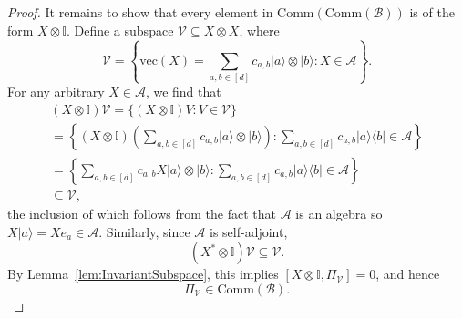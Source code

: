 \begin{proof}
It remains to show that every element in $\text{Comm}(\text{Comm}(\mathcal{B}))$ is of the form $X \otimes \mathbb{I}$.
Define a subspace $\mathcal{V} \subseteq X \otimes X$, where
\begin{equation}
    \mathcal{V} = \left\{\text{vec}(X) = \sum_{a, b \in [d]} c_{a, b} |a \rangle \otimes |b \rangle : X \in \mathcal{A} \right\}.
\end{equation}
For any arbitrary $X \in \mathcal{A}$, we find that
\begin{equation}
    \begin{split}
        (X \otimes \mathbb{I}) \mathcal{V}
        = \{(X \otimes \mathbb{I}) V : V \in \mathcal{V}\}\\
        = \left\{ (X \otimes \mathbb{I}) \left( \sum_{a, b \in [d]} c_{a, b} |a \rangle \otimes |b \rangle \right) : \sum_{a, b \in [d]} c_{a, b} |a \rangle \langle b | \in \mathcal{A} \right\}\\
        = \left\{ \sum_{a, b \in [d]} c_{a, b} X|a\rangle \otimes |b\rangle : \sum_{a, b \in [d]} c_{a, b} |a \rangle \langle b | \in \mathcal{A} \right\}\\
        \subseteq \mathcal{V},
    \end{split}
\end{equation}
the inclusion of which follows from the fact that $\mathcal{A}$ is an algebra so $X|a\rangle = Xe_a \in \mathcal{A}$.
Similarly, since $\mathcal{A}$ is self-adjoint,
\begin{equation}
    (X^{*} \otimes \mathbb{I}) \mathcal{V} \subseteq \mathcal{V}.
\end{equation}
By Lemma~\ref{lem:InvariantSubspace}, this implies $[X \otimes \mathbb{I}, \Pi_{\mathcal{V}}] = 0$, and hence
\begin{equation}\label{eq:PiInCommB}
    \Pi_{\mathcal{V}} \in \text{Comm}(\mathcal{B}).
\end{equation}


\end{proof}
